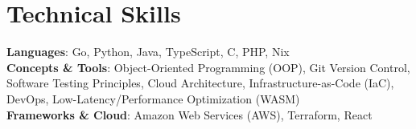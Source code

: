 \documentclass{article}
\begin{document}
\section{Technical Skills}
 \begin{itemize}[leftmargin=0.15in, label={}]
    \small{\item{
     \textbf{Languages}{: Go, Python, Java, TypeScript, C, PHP, Nix} \\
     \textbf{Concepts \& Tools}{: Object-Oriented Programming (OOP), Git Version Control, Software Testing Principles, Cloud Architecture, Infrastructure-as-Code (IaC), DevOps, Low-Latency/Performance Optimization (WASM)} \\
     \textbf{Frameworks \& Cloud}{: Amazon Web Services (AWS), Terraform, React}
    }}
 \end{itemize}

\end{document}
